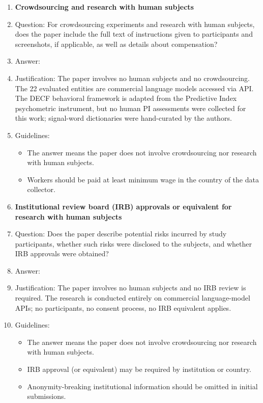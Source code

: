 \begin{enumerate}
\item {\bf Crowdsourcing and research with human subjects}
    \item[] Question: For crowdsourcing experiments and research with human subjects, does the paper include the full text of instructions given to participants and screenshots, if applicable, as well as details about compensation?
    \item[] Answer: \answerNA{}
    \item[] Justification: The paper involves no human subjects and no crowdsourcing. The 22 evaluated entities are commercial language models accessed via API. The DECF behavioral framework is adapted from the Predictive Index psychometric instrument, but no human PI assessments were collected for this work; signal-word dictionaries were hand-curated by the authors.
    \item[] Guidelines:
    \begin{itemize}
        \item The answer \answerNA{} means the paper does not involve crowdsourcing nor research with human subjects.
        \item Workers should be paid at least minimum wage in the country of the data collector.
    \end{itemize}

\item {\bf Institutional review board (IRB) approvals or equivalent for research with human subjects}
    \item[] Question: Does the paper describe potential risks incurred by study participants, whether such risks were disclosed to the subjects, and whether IRB approvals were obtained?
    \item[] Answer: \answerNA{}
    \item[] Justification: The paper involves no human subjects and no IRB review is required. The research is conducted entirely on commercial language-model APIs; no participants, no consent process, no IRB equivalent applies.
    \item[] Guidelines:
    \begin{itemize}
        \item The answer \answerNA{} means the paper does not involve crowdsourcing nor research with human subjects.
        \item IRB approval (or equivalent) may be required by institution or country.
        \item Anonymity-breaking institutional information should be omitted in initial submissions.
    \end{itemize}


\end{enumerate}

